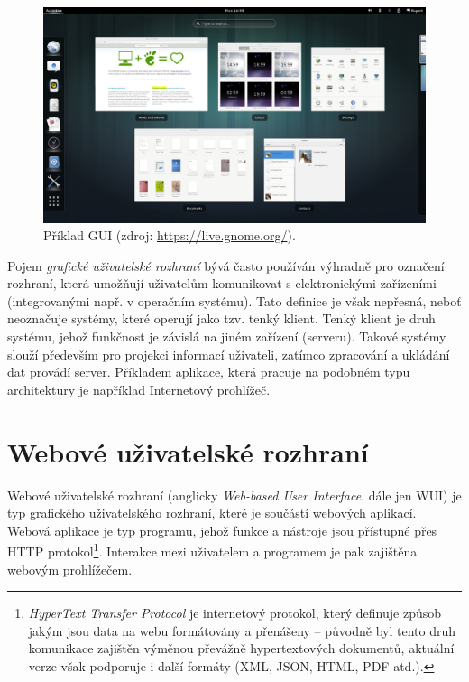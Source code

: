 \begin{figure}[htbp]
    \centering
    \includegraphics[width=\textwidth]{images/gui-example.png}
    \caption{Příklad GUI (zdroj: \url{https://live.gnome.org/}).}
\end{figure}

Pojem \textit{grafické uživatelské rozhraní} bývá často používán výhradně pro označení rozhraní, která umožňují uživatelům komunikovat s elektronickými zařízeními (integrovanými např. v operačním systému). Tato definice je však nepřesná, neboť neoznačuje systémy, které operují jako tzv. tenký klient. Tenký klient je druh systému, jehož funkčnost je závislá na jiném zařízení (serveru). Takové systémy slouží především pro projekci informací uživateli, zatímco zpracování a ukládání dat provádí server. Příkladem aplikace, která pracuje na podobném typu architektury je například Internetový prohlížeč.

\section{Webové uživatelské rozhraní}
\label{sec:wui}

Webové uživatelské rozhraní (anglicky \textit{Web-based User Interface}, dále jen WUI) je typ grafického uživatelského rozhraní, které je součástí webových aplikací. Webová aplikace je typ programu, jehož funkce a nástroje jsou přístupné přes HTTP protokol\footnote{\textit{HyperText Transfer Protocol} je internetový protokol, který definuje způsob jakým jsou data na webu formátovány a přenášeny -- původně byl tento druh komunikace zajištěn výměnou převážně hypertextových dokumentů, aktuální verze však podporuje i další formáty (XML, JSON, HTML, PDF atd.).}. Interakce mezi uživatelem a programem je pak zajištěna webovým prohlížečem.

